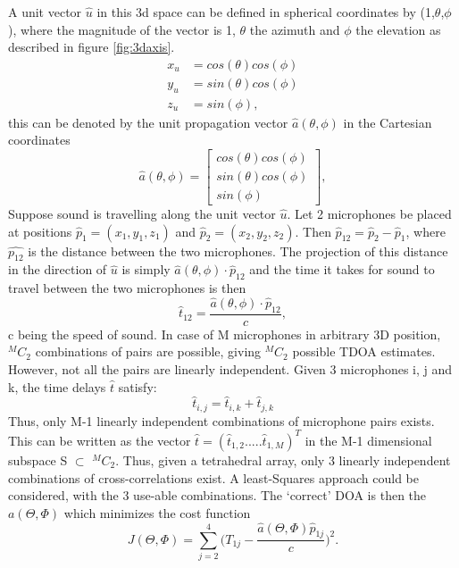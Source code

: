 A unit vector $\hat{u}$ in this 3d space can be defined in spherical coordinates by (1,$\theta$,$\phi$), where the magnitude of the vector is 1, $\theta$ the azimuth and $\phi$ the elevation as described in figure \ref{fig:3daxis}.
\begin{equation}
    \begin{split}
        x_u&=cos(\theta)cos(\phi) \\
        y_u&=sin(\theta)cos(\phi) \\
        z_u&=sin(\phi),
    \end{split}
\end{equation}
this can be denoted by the unit propagation vector ${\hat{a}(\theta,\phi)}$ in the Cartesian coordinates
\begin{equation}
    \hat{a}(\theta,\phi)=\begin{bmatrix}cos(\theta)cos(\phi) \\sin(\theta)cos(\phi) \\sin(\phi)\end{bmatrix},
\end{equation}
Suppose sound is travelling along the unit vector $\hat{u}$. Let 2 microphones be placed at positions $\hat{p}_1=(x_1,y_1,z_1)$ and $\hat{p}_2=(x_2,y_2,z_2)$.  Then $\hat{p}_{12}=\hat{p}_{2}-\hat{p}_{1}$, where ${\hat{p_{12}}}$ is the distance between the two microphones. The projection of this distance in the direction of $\hat{u}$ is simply $\hat{a}(\theta,\phi)\cdot\hat{p}_{12}$ and the time it takes for sound to travel between the two microphones is then 
\begin{equation}
    \hat{t}_{12}=\frac{\hat{a}(\theta,\phi)\cdot\hat{p}_{12}}{c},
\end{equation} c being the speed of sound. In case of M microphones in arbitrary 3D position, $^MC_2$ combinations of pairs are possible, giving $^MC_2$ possible TDOA estimates. However, not all the pairs are linearly independent. Given 3 microphones i, j and k, the time delays $\hat{t}$ satisfy:
\begin{equation}
    \hat{t}_{i,j}=\hat{t}_{i,k}+\hat{t}_{j,k}
    \label{Eq:linearDep}
\end{equation}
Thus, only M-1 linearly independent combinations of microphone pairs exists. This can be written as the vector $\hat{t}=(\hat{t}_{1,2}.....\hat{t}_{1,M})^T$ in the M-1 dimensional subspace S $\subset$ $^MC_2$. Thus, given a tetrahedral array, only 3 linearly independent combinations of cross-correlations exist. A least-Squares approach could be considered, with the 3 use-able combinations. The `correct' DOA is then the $a(\Theta,\Phi)$ which minimizes the cost function
\begin{equation}
    J(\Theta,\Phi) = \sum\limits_{j=2}^4\bigg(T_{1j}-\frac{\hat{a}(\Theta,\Phi)\hat{p}_{1j}}{c}\bigg)^2.
\end{equation}


